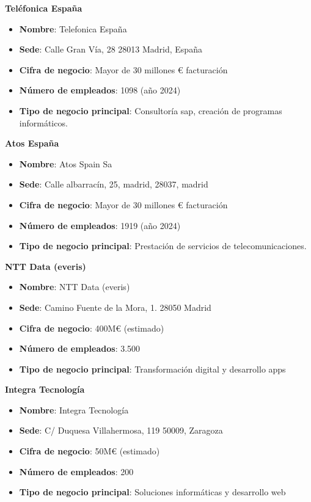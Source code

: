 \documentclass[11.5pt]{article}
\begin{document}
	\noindent\textbf{{\large Teléfonica España}}
	
	\begin{itemize}
		\item \textbf{Nombre}: Telefonica España
		\item 	\textbf{Sede}: Calle Gran Vía, 28 28013 Madrid, España
		\item 	\textbf{Cifra de negocio}: Mayor de 30 millones € facturación
		\item 	\textbf{Número de empleados}: 1098 (año 2024)
		\item 	\textbf{Tipo de negocio principal}: Consultoría sap, creación de programas informáticos.
	\end{itemize}
	
	\noindent\textbf{{\large Atos España}}
	
	\begin{itemize}
		\item \textbf{Nombre}: Atos Spain Sa
		\item 	\textbf{Sede}: Calle albarracín, 25, madrid, 28037, madrid
		\item 	\textbf{Cifra de negocio}: Mayor de 30 millones € facturación
		\item 	\textbf{Número de empleados}: 1919 (año 2024)
		\item 	\textbf{Tipo de negocio principal}: Prestación de servicios de telecomunicaciones.
	\end{itemize}
	
	\noindent\textbf{{\large NTT Data (everis)}}
	
	\begin{itemize}
		\item \textbf{Nombre}: NTT Data (everis)
		\item 	\textbf{Sede}: Camino Fuente de la Mora, 1. 28050 Madrid
		\item 	\textbf{Cifra de negocio}: 400M€ (estimado)
		\item 	\textbf{Número de empleados}: 3.500
		\item 	\textbf{Tipo de negocio principal}: Transformación digital y desarrollo apps
	\end{itemize}
	
	\noindent\textbf{{\large Integra Tecnología}}
	
	\begin{itemize}
		\item \textbf{Nombre}: Integra Tecnología
		\item 	\textbf{Sede}: C/ Duquesa Villahermosa, 119 50009, Zaragoza
		\item 	\textbf{Cifra de negocio}: 50M€ (estimado)
		\item 	\textbf{Número de empleados}: 200
		\item 	\textbf{Tipo de negocio principal}: Soluciones informáticas y desarrollo web
	\end{itemize}
	
\end{document}
